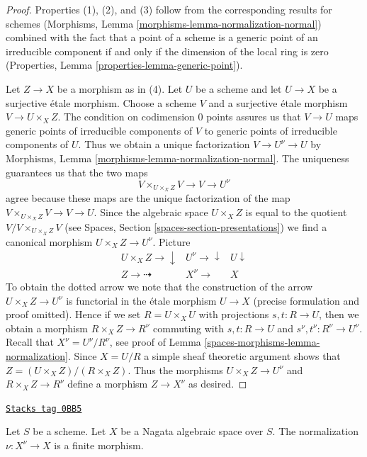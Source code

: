 \begin{proof}
Properties (1), (2), and (3) follow from the corresponding results
for schemes (Morphisms, Lemma \ref{morphisms-lemma-normalization-normal})
combined with the fact that a point of a scheme is a generic
point of an irreducible component if and only if the dimension
of the local ring is zero
(Properties, Lemma \ref{properties-lemma-generic-point}).

\medskip\noindent
Let $Z \to X$ be a morphism as in (4). Let $U$ be a scheme and let
$U \to X$ be a surjective \'etale morphism. Choose a scheme $V$ and
a surjective \'etale morphism $V \to U \times_X Z$. The condition on
codimension $0$ points assures us that $V \to U$ maps generic points of
irreducible components of $V$ to generic points of irreducible
components of $U$. Thus we obtain a unique factorization
$V \to U^\nu \to U$ by
Morphisms, Lemma \ref{morphisms-lemma-normalization-normal}.
The uniqueness guarantees us that the two maps
$$
V \times_{U \times_X Z} V \to V \to U^\nu
$$
agree because these maps are the unique factorization of the map
$V \times_{U \times_X Z} V \to V \to U$.
Since the algebraic space $U \times_X Z$ is equal to the quotient
$V/V \times_{U \times_X Z} V$
(see Spaces, Section \ref{spaces-section-presentations})
we find a canonical morphism
$U \times_X Z \to U^\nu$. Picture
$$
\begin{array}{ccc}U \times_X Z \longrightarrow\downarrow & U^\nu \longrightarrow\downarrow & U \downarrow \\ Z \longrightarrow\dashrightarrow & X^\nu \longrightarrow & X\end{array}
$$
To obtain the dotted arrow we note that the construction of the
arrow $U \times_X Z \to U^\nu$ is functorial in the \'etale morphism $U \to X$
(precise formulation and proof omitted).
Hence if we set $R = U \times_X U$ with projections $s, t : R \to U$,
then we obtain a morphism $R \times_X Z \to R^\nu$ commuting with
$s, t : R \to U$ and $s^\nu, t^\nu : R^\nu \to U^\nu$.
Recall that $X^\nu = U^\nu/R^\nu$, see proof of
Lemma \ref{spaces-morphisms-lemma-normalization}. Since $X = U/R$ a
simple sheaf theoretic argument
shows that $Z = (U \times_X Z)/(R \times_X Z)$. Thus the morphisms
$U \times_X Z \to U^\nu$ and $R \times_X Z \to R^\nu$ define a
morphism $Z \to X^\nu$ as desired.
\end{proof}

\begin{lemma}
\label{spaces-morphisms-lemma-nagata-normalization}
\href{https://stacks.math.columbia.edu/tag/0BB5}{\texttt{Stacks tag 0BB5}}

Let $S$ be a scheme. Let $X$ be a Nagata algebraic space over $S$.
The normalization $\nu : X^\nu \to X$ is a finite morphism.
\end{lemma}

